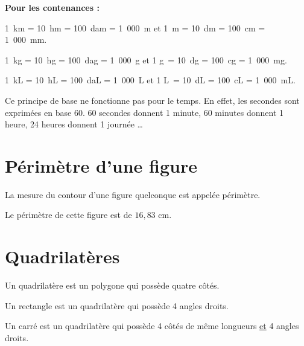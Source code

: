 \documentclass[11pt]{article}
\begin{document}
\textbf{Pour les contenances :}
\begin{center}
\end{center}

\begin{exemple}
1\ km = 10\ hm = 100\ dam = 1\ 000\ m et 1\ m = 10\ dm = 100\ cm = 1\
000\ mm.

1\ kg = 10\ hg = 100\ dag = 1\ 000\ g et 1 g\ = 10\ dg = 100\ cg = 1\
000\ mg.

1\ kL = 10\ hL = 100\ daL = 1\ 000\ L et 1 L\ = 10\ dL = 100\ cL = 1\
000\ mL.
\end{exemple}

\begin{remarque}
Ce principe de base ne fonctionne pas pour le temps. En effet, les
secondes sont exprimées en base 60. 60 secondes donnent 1 minute, 60
minutes donnent 1 heure, 24 heures donnent 1 journée \dots
\end{remarque}
\section{Périmètre d'une figure}

\begin{vocabulaire}
La mesure du contour d'une figure quelconque est appelée périmètre.
\end{vocabulaire}

\begin{center}
\end{center}

Le périmètre de cette figure est de $16,83$ cm. 

\begin{center}
\opmanyadd[voperator=bottom]{4}{1}{2}{3}{4}{2.83}
\end{center}

\section{Quadrilatères}
\begin{definition}
Un quadrilatère est un polygone qui possède quatre côtés.
\end{definition}

\begin{multicols}{2}

\begin{definition}
Un rectangle est un quadrilatère qui possède 4 angles droits.
\end{definition}

\begin{center}

\end{center}

\begin{definition}
Un carré est un quadrilatère qui possède 4 côtés de même longueurs
\underline{et} 4 angles droits.
\end{definition}

\begin{center}

\end{center}

\end{multicols}
\end{document}
